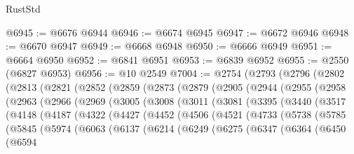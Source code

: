 \begin{lexlean}{RustStd}
\begin{coremodule}
@6945 := @6676 @6944
@6946 := @6674 @6945
@6947 := @6672 @6946
@6948 := @6670 @6947
@6949 := @6668 @6948
@6950 := @6666 @6949
@6951 := @6664 @6950
@6952 := @6841 @6951
@6953 := @6839 @6952
@6955 := @2550 (@6827 @6953)
@6956 := @10 @2549
@7004 := @2754
    (@2793
      (@2796
        (@2802
          (@2813
            (@2821
              (@2852
                (@2859
                  (@2873
                    (@2879
                      (@2905
                        (@2944
                          (@2955
                            (@2958
                              (@2963
                                (@2966
                                  (@2969
                                    (@3005
                                      (@3008
                                        (@3011
                                          (@3081
                                            (@3395
                                              (@3440
                                                (@3517
                                                  (@4148
                                                    (@4187
                                                      (@4322
                                                        (@4427
                                                          (@4452
                                                            (@4506
                                                              (@4521
                                                                (@4733
                                                                  (@5738
                                                                    (@5785
                                                                      (@5845
                                                                        (@5974
                                                                          (@6063
                                                                            (@6137
                                                                              (@6214
                                                                                (@6249
                                                                                  (@6275
                                                                                    (@6347
                                                                                      (@6364
                                                                                        (@6450
                                                                                          (@6594

\end{coremodule}
\end{lexlean}
